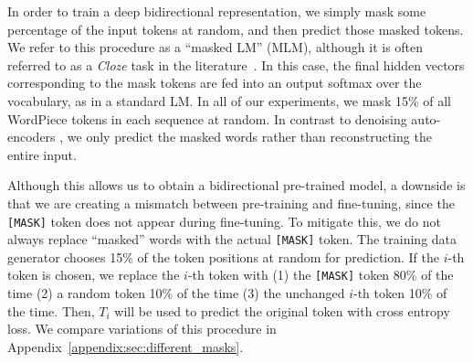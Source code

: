 In order to train a deep bidirectional representation, we simply mask some percentage of the input tokens at random, and then predict those masked tokens. We refer to this procedure as a ``masked LM'' (MLM), although it is often referred to as a {\it Cloze} task in the literature~\cite{taylor:1953:_cloze}. In this case, the final hidden vectors corresponding to the mask tokens are fed into an output softmax over the vocabulary, as in a standard LM. In all of our experiments, we mask 15\% of all WordPiece tokens in each sequence at random. In contrast to denoising auto-encoders \cite{vincent:2008}, we only predict the masked words rather than reconstructing the entire input.  

Although this allows us to obtain a bidirectional pre-trained model, a downside is that we are creating a mismatch between pre-training and fine-tuning, since the {\tt [MASK]} token does not appear during fine-tuning. To mitigate this, we do not always replace ``masked'' words with the actual {\tt [MASK]} token. The training data generator chooses 15\% of the token positions at random for prediction. If the $i$-th token is chosen, we replace the $i$-th token with (1) the {\tt [MASK]} token 80\% of the time (2) a random token 10\% of the time (3) the unchanged $i$-th token 10\% of the time. Then, $T_i$ will be used to predict the original token with cross entropy loss.
We compare variations of this procedure in Appendix~\ref{appendix:sec:different_masks}.
\vspace{.2cm}

